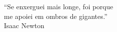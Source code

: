 \begin{epigrafe}
  \vspace*{\fill}
	\begin{flushright}
		``Se enxerguei mais longe, foi porque\\
        me apoiei em ombros de gigantes.''\\
		Isaac Newton
	\end{flushright}
\end{epigrafe}
